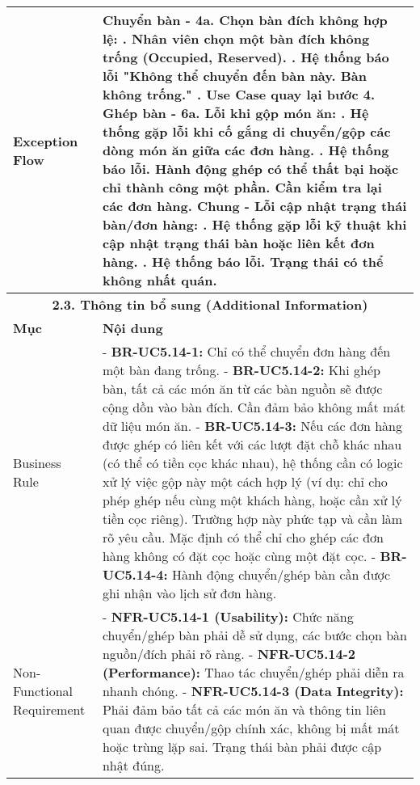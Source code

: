 \begin{longtable}{|m{4cm}|p{11cm}|}
Exception Flow & \textbf{Chuyển bàn - 4a. Chọn bàn đích không hợp lệ:} \newline    1. Nhân viên chọn một bàn đích không trống (Occupied, Reserved). \newline    2. Hệ thống báo lỗi "Không thể chuyển đến bàn này. Bàn không trống." \newline    3. Use Case quay lại bước 4. \newline \textbf{Ghép bàn - 6a. Lỗi khi gộp món ăn:} \newline    1. Hệ thống gặp lỗi khi cố gắng di chuyển/gộp các dòng món ăn giữa các đơn hàng. \newline    2. Hệ thống báo lỗi. Hành động ghép có thể thất bại hoặc chỉ thành công một phần. Cần kiểm tra lại các đơn hàng. \newline \textbf{Chung - Lỗi cập nhật trạng thái bàn/đơn hàng:} \newline    1. Hệ thống gặp lỗi kỹ thuật khi cập nhật trạng thái bàn hoặc liên kết đơn hàng. \newline    2. Hệ thống báo lỗi. Trạng thái có thể không nhất quán. \\
\hline
\multicolumn{2}{|c|}{\textbf{2.3. Thông tin bổ sung (Additional Information)}} \\
\hline
\textbf{Mục} & \textbf{Nội dung} \\
\hline
Business Rule & - \textbf{BR-UC5.14-1:} Chỉ có thể chuyển đơn hàng đến một bàn đang trống. \newline - \textbf{BR-UC5.14-2:} Khi ghép bàn, tất cả các món ăn từ các bàn nguồn sẽ được cộng dồn vào bàn đích. Cần đảm bảo không mất mát dữ liệu món ăn. \newline - \textbf{BR-UC5.14-3:} Nếu các đơn hàng được ghép có liên kết với các lượt đặt chỗ khác nhau (có thể có tiền cọc khác nhau), hệ thống cần có logic xử lý việc gộp này một cách hợp lý (ví dụ: chỉ cho phép ghép nếu cùng một khách hàng, hoặc cần xử lý tiền cọc riêng). Trường hợp này phức tạp và cần làm rõ yêu cầu. Mặc định có thể chỉ cho ghép các đơn hàng không có đặt cọc hoặc cùng một đặt cọc. \newline - \textbf{BR-UC5.14-4:} Hành động chuyển/ghép bàn cần được ghi nhận vào lịch sử đơn hàng. \\
\hline
Non-Functional Requirement & - \textbf{NFR-UC5.14-1 (Usability):} Chức năng chuyển/ghép bàn phải dễ sử dụng, các bước chọn bàn nguồn/đích phải rõ ràng. \newline - \textbf{NFR-UC5.14-2 (Performance):} Thao tác chuyển/ghép phải diễn ra nhanh chóng. \newline - \textbf{NFR-UC5.14-3 (Data Integrity):} Phải đảm bảo tất cả các món ăn và thông tin liên quan được chuyển/gộp chính xác, không bị mất mát hoặc trùng lặp sai. Trạng thái bàn phải được cập nhật đúng. \\
\hline
\end{longtable}


